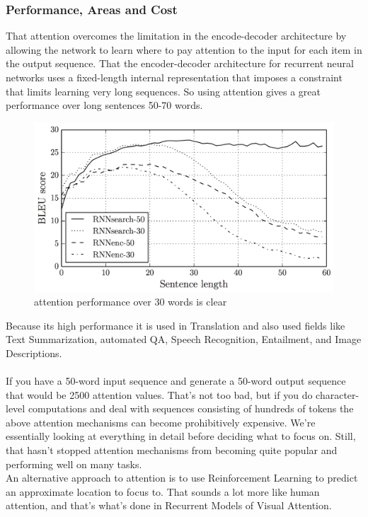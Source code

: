 \subsubsection{Performance, Areas and Cost}
That attention overcomes the limitation in the encode-decoder architecture by allowing the network to learn where to pay attention to the input for each item in the output sequence. That the encoder-decoder architecture for recurrent neural networks uses a fixed-length internal representation that imposes a constraint that limits learning very long sequences. So using attention gives a great performance over long sentences 50-70 words.\\ 
\begin{figure}[H]%
    \center%
    \includegraphics[width=\textwidth]{images/amir/bahdanau_attn.png}%
    \caption[This is a attention performance image]{  attention performance over 30 words is clear
    }\label{fig:attention performance}%
  \end{figure}
Because its high performance it is used in Translation and also used fields like Text Summarization, automated QA, Speech Recognition, Entailment, and Image Descriptions.\cite{web020}\\\\
If you have a 50-word input sequence and generate a 50-word output sequence that would be 2500 attention values. That’s not too bad, but if you do character-level computations and deal with sequences consisting of hundreds of tokens the above attention mechanisms can become prohibitively expensive. We’re essentially looking at everything in detail before deciding what to focus on. Still, that hasn’t stopped attention mechanisms from becoming quite popular and performing well on many tasks.\\
An alternative approach to attention is to use Reinforcement Learning to predict an approximate location to focus to. That sounds a lot more like human attention, and that’s what’s done in Recurrent Models of Visual Attention.
